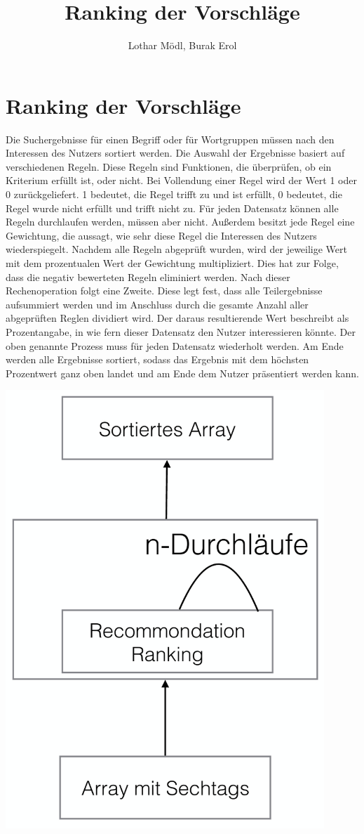 
\title{Ranking der Vorschläge}
\author{Lothar Mödl, Burak Erol}

\section{Ranking der Vorschläge}

Die Suchergebnisse für einen Begriff oder  für Wortgruppen müssen nach den Interessen des Nutzers sortiert werden. Die Auswahl der Ergebnisse basiert auf verschiedenen Regeln. Diese Regeln sind Funktionen, die überprüfen, ob ein Kriterium erfüllt ist, oder nicht. Bei Vollendung einer Regel wird der Wert 1 oder 0 zurückgeliefert. 1 bedeutet, die Regel trifft zu und ist erfüllt, 0 bedeutet, die Regel wurde nicht erfüllt und trifft nicht zu. Für jeden Datensatz können alle Regeln durchlaufen werden, müssen aber nicht. Außerdem besitzt jede Regel eine Gewichtung, die aussagt, wie sehr diese Regel die Interessen des Nutzers wiederspiegelt. Nachdem alle Regeln abgeprüft wurden, wird der jeweilige Wert mit dem prozentualen Wert der Gewichtung multipliziert. Dies hat zur Folge, dass die negativ bewerteten Regeln eliminiert werden. Nach dieser Rechenoperation folgt eine Zweite. Diese legt fest, dass alle Teilergebnisse aufsummiert werden und im Anschluss durch die gesamte Anzahl aller abgeprüften Reglen dividiert wird. Der daraus resultierende Wert beschreibt als Prozentangabe, in wie fern dieser Datensatz den Nutzer interessieren könnte. Der oben genannte Prozess muss für jeden Datensatz wiederholt werden. Am Ende werden alle Ergebnisse sortiert, sodass das Ergebnis mit dem höchsten Prozentwert ganz oben landet und am Ende dem Nutzer präsentiert werden kann. 

\includegraphics[width=12cm]{Pics/rankinguebersicht}

